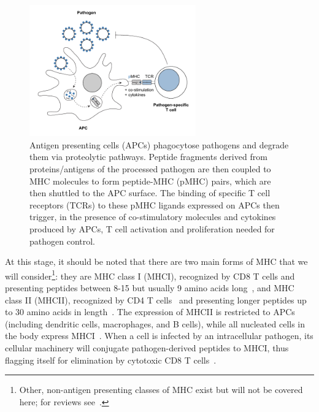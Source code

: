 \begin{figure}[b!]
    \centering
    \includegraphics[width=0.64\textwidth]{Figures/intro/fig1_TcellActivation.pdf}
    \caption[Overview of T cell activation via antigen recognition]{ Antigen presenting cells (APCs) phagocytose pathogens and degrade them via proteolytic pathways. Peptide fragments derived from proteins/antigens of the processed pathogen are then coupled to MHC molecules to form peptide-MHC (pMHC) pairs, which are then shuttled to the APC surface. The binding of specific T cell receptors (TCRs) to these pMHC ligands expressed on APCs then trigger, in the presence of co-stimulatory molecules and cytokines produced by APCs, T cell activation and proliferation needed for pathogen control.}
    \label{fig:intro_TcellActivation}
\end{figure}

At this stage, it should be noted that there are two main forms of MHC that we will consider\footnote{Other, non-antigen presenting classes of MHC exist but will not be covered here; for reviews see~\cite{colten1984expression,gruen2001human}.}: they are MHC class I (MHCI), recognized by CD8\pos{} T cells and presenting peptides between 8-15 but usually 9 amino acids long~\cite{trolle2016length,meydan2013prediction}, and MHC class II (MHCII), recognized by CD4\pos{} T cells~\cite{rock2016present} and presenting longer peptides up to 30 amino acids in length~\cite{meydan2013prediction}. The expression of MHCII is restricted to APCs (including dendritic cells, macrophages, and B cells), while all nucleated cells in the body express MHCI~\cite{hewitt2003mhc,van2011expression,rock2016present}. When a cell is infected by an intracellular pathogen, its cellular machinery will conjugate pathogen-derived peptides to MHCI, thus flagging itself for elimination by cytotoxic CD8\pos{} T cells~\cite{rock2016present}.

